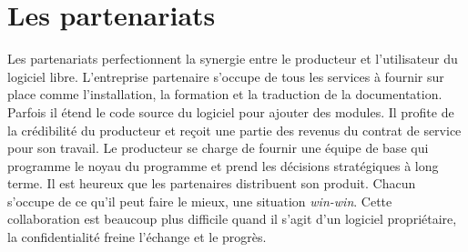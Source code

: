 \section*{Les partenariats}
Les partenariats perfectionnent la synergie entre le producteur et l'utilisateur du logiciel
libre. L'entreprise partenaire s'occupe de tous les services à fournir sur place comme l'installation, la formation et
la traduction de la documentation. Parfois il étend le code source du logiciel pour ajouter des modules. 
Il profite de la crédibilité du producteur et reçoit une partie des revenus du contrat de service pour son travail.
Le producteur se charge de fournir une équipe de base qui programme le noyau du programme et 
prend les décisions stratégiques à long terme. Il est heureux que les partenaires
distribuent son produit. Chacun s'occupe de ce qu'il peut faire le mieux, une situation \textit{win-win}.
Cette collaboration est beaucoup plus difficile
quand il s'agit d'un logiciel propriétaire, la confidentialité freine l'échange et le progrès.

	
	